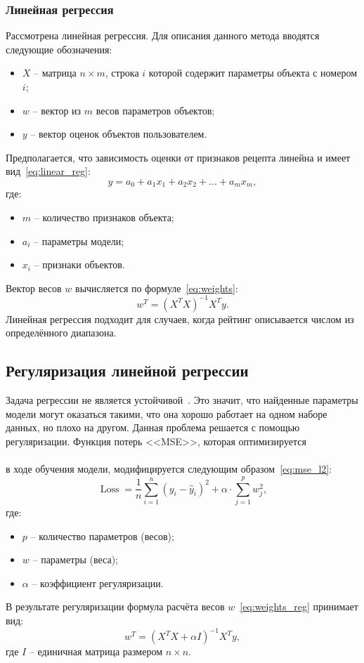 \subsubsection{Линейная регрессия}
Рассмотрена линейная регрессия.
Для описания данного метода вводятся следующие обозначения:
\begin{itemize}
    \item $X$ -- матрица $n \times m$, строка $i$ которой содержит параметры объекта с номером $i$;
    \item $w$ -- вектор из $m$ весов параметров объектов;
    \item $y$ -- вектор оценок объектов пользователем.
\end{itemize}
Предполагается, что зависимость оценки от признаков рецепта линейна и имеет вид~\eqref{eq:linear_reg}:
\begin{equation}
	\label{eq:linear_reg}
	y = a_0 + a_1x_1 + a_2x_2 + . . . + a_mx_m,
\end{equation}
где:
\begin{itemize}
	\item $m$ -- количество признаков объекта;
	\item $a_i$ -- параметры модели;
	\item $x_i$ -- признаки объектов.
\end{itemize}

Вектор весов $w$ вычисляется по формуле~\eqref{eq:weights}:
\begin{equation}
\label{eq:weights}
    w^T = (X^TX)^{-1}X^Ty.
\end{equation}
Линейная регрессия подходит для случаев, когда рейтинг описывается числом из определённого диапазона.

\subsection{Регуляризация линейной регрессии}
Задача регрессии не является устойчивой~\cite{aggarwal}.
Это значит, что найденные параметры модели могут оказаться такими, что она хорошо работает на одном наборе данных, но плохо на другом.
Данная проблема решается с помощью регуляризации.
Функция потерь <<MSE>>, которая оптимизируется \\ \\в ходе обучения модели, модифицируется следующим образом~\eqref{eq:mse_l2}:
\begin{equation}
	\label{eq:mse_l2}
	\operatorname{Loss} = \frac{1}{n}\sum_{i=1}^{n}{(y_i - \hat{y}_i)^2} + \alpha \cdot \sum_{j=1}^{p}{w_j^2},
\end{equation}
где:
\begin{itemize}
	\item $p$ -- количество параметров (весов);
	\item $w$ -- параметры (веса);
	\item $\alpha$ -- коэффициент регуляризации.
\end{itemize}
В результате регуляризации формула расчёта весов $w$~\eqref{eq:weights_reg} принимает вид:
\begin{equation}
\label{eq:weights_reg}
	 w^T = (X^TX + \alpha I)^{-1}X^Ty,
\end{equation}
где $I$ -- единичная матрица размером $n \times n$.

